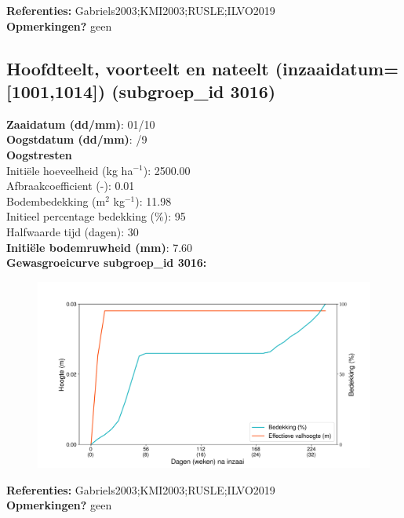 \documentclass{article}
\begin{document}
  \textbf{Referenties:} Gabriels2003;KMI2003;RUSLE;ILVO2019 \vspace{0.10cm} \\ 
  \textbf{Opmerkingen?} geen \vspace{0.10cm} \\ 
 \newpage 
 \subsection{Hoofdteelt, voorteelt en nateelt (inzaaidatum=[1001,1014]) (subgroep\_id 3016)} 
  \textbf{Zaaidatum (dd/mm)}: 01/10  \vspace{0.10cm} \\ 
  \textbf{Oogstdatum (dd/mm)}: /9  \vspace{0.10cm} \\ 
  \textbf{Oogstresten} \vspace{0.05cm} \\ 
  \tab Initi\"{e}le hoeveelheid (kg ha$^{-1}$): 2500.00 \vspace{0.05cm} \\ 
  \tab Afbraakcoefficient (-): 0.01 \vspace{0.05cm} \\ 
  \tab Bodembedekking (m$^2$ kg$^{-1}$): 11.98 \vspace{0.05cm} \\ 
  \tab Initieel percentage bedekking (\%): 95 \vspace{0.05cm} \\ 
  \tab Halfwaarde tijd (dagen): 30 \vspace{0.05cm} \\ 
  \textbf{Initi\"{e}le bodemruwheid (mm)}: 7.60 \vspace{0.05cm} \\ 
  \textbf{Gewasgroeicurve subgroep\_id 3016:} 
 \begin{center} \begin{figure}[H] \includegraphics[width=12.5cm]{temp/3016.png} \end{figure} \end{center} 
  \textbf{Referenties:} Gabriels2003;KMI2003;RUSLE;ILVO2019 \vspace{0.10cm} \\ 
  \textbf{Opmerkingen?} geen \vspace{0.10cm} \\ 
 \newpage 
\end{document}
